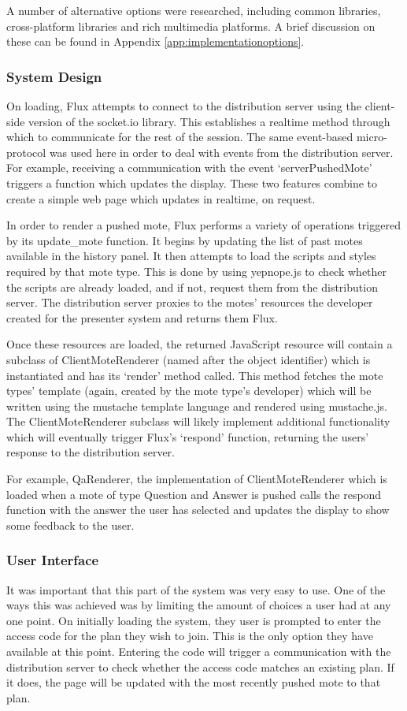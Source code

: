 \documentclass[a4papert,11pt,notitlepage]{article}
\begin{document}
A number of alternative options were researched, including common libraries, cross-platform libraries and rich multimedia platforms. A brief discussion on these can be found in Appendix \ref{app:implementationoptions}.

\subsubsection{System Design}
On loading, Flux attempts to connect to the distribution server using the client-side version of the socket.io library. This establishes a realtime method through which to communicate for the rest of the session. The same event-based micro-protocol was used here in order to deal with events from the distribution server. For example, receiving a communication with the event `serverPushedMote' triggers a function which updates the display. These two features combine to create a simple web page which updates in realtime, on request.

In order to render a pushed mote, Flux performs a variety of operations triggered by its update\_mote function. It begins by updating the list of past motes available in the history panel. It then attempts to load the scripts and styles required by that mote type. This is done by using yepnope.js\cite{yepnope:web} to check whether the scripts are already loaded, and if not, request them from the distribution server. The distribution server proxies to the motes' resources the developer created for the presenter system and returns them Flux.

Once these resources are loaded, the returned JavaScript resource will contain a subclass of ClientMoteRenderer (named after the object identifier) which is instantiated and has its `render' method called. This method fetches the mote types' template (again, created by the mote type's developer) which will be written using the mustache\cite{mustache:web} template language and rendered using mustache.js\cite{mustachejs:web}. The ClientMoteRenderer subclass will likely implement additional functionality which will eventually trigger Flux's `respond' function, returning the users' response to the distribution server.

For example, QaRenderer, the implementation of ClientMoteRenderer which is loaded when a mote of type Question and Answer is pushed calls the respond function with the answer the user has selected and updates the display to show some feedback to the user.

\subsubsection{User Interface}
It was important that this part of the system was very easy to use. One of the ways this was achieved was by limiting the amount of choices a user had at any one point. On initially loading the system, they user is prompted to enter the access code for the plan they wish to join. This is the only option they have available at this point. Entering the code will trigger a communication with the distribution server to check whether the access code matches an existing plan. If it does, the page will be updated with the most recently pushed mote to that plan.
\end{document}
